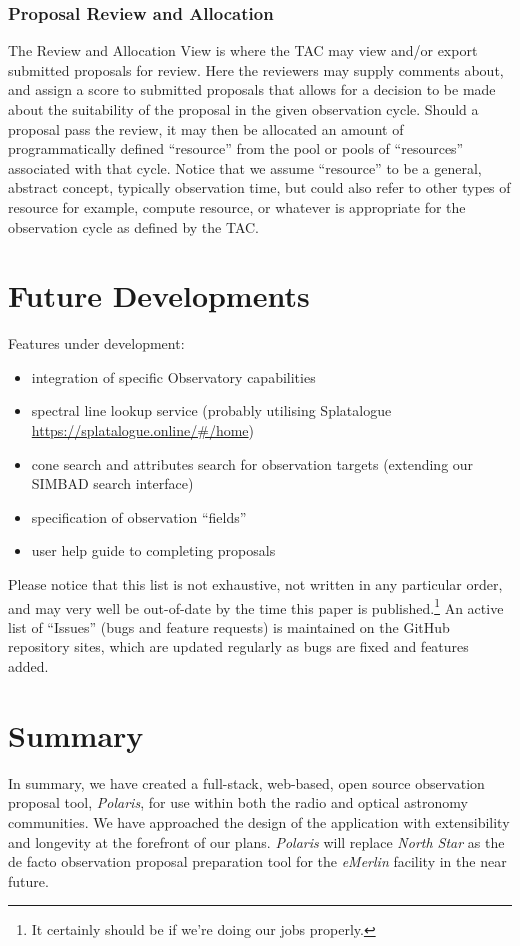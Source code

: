 \documentclass[11pt,twoside]{article}
\begin{document}
\subsubsection{Proposal Review and Allocation}\label{subsubsec:proposal-review-and-allocation}


The Review and Allocation View is where the TAC may view and/or export submitted proposals for review.
Here the reviewers may supply comments about, and assign a score to submitted proposals that allows for
a decision to be made about the suitability of the proposal in the given observation cycle.
Should a proposal pass the review, it may then be allocated an amount of programmatically defined ``resource''
from the pool or pools of ``resources'' associated with that cycle.
Notice that we assume ``resource'' to be a general, abstract concept, typically observation
time, but could also refer to other types of resource for example, compute resource, or
whatever is appropriate for the observation cycle as defined by the TAC.\@


\section{Future Developments}\label{sec:future-developments}
Features under development:
\begin{itemize}
    \item integration of specific Observatory capabilities
    \item spectral line lookup service (probably utilising Splatalogue \url{https://splatalogue.online/#/home})
    \item cone search and attributes search for observation targets (extending our SIMBAD search interface)
    \item specification of observation ``fields''
    \item user help guide to completing proposals
\end{itemize}
Please notice that this list is not exhaustive, not written in any particular order, and may very well be
out-of-date by the time this paper is published.\footnote{It certainly should be if we're doing our jobs
properly.}
An active list of ``Issues'' (bugs and feature requests) is maintained on the GitHub repository sites, which
are updated regularly as bugs are fixed and features added.


\section{Summary}\label{sec:summary}
In summary, we have created a full-stack, web-based, open source observation proposal tool, \emph{Polaris},
for use within both the radio and optical astronomy communities.
We have approached the design of the application with extensibility and longevity at the forefront of
our plans.
\emph{Polaris} will replace \emph{North Star} as the de facto observation proposal preparation tool for
the \emph{eMerlin} facility in the near future.
\end{document}
